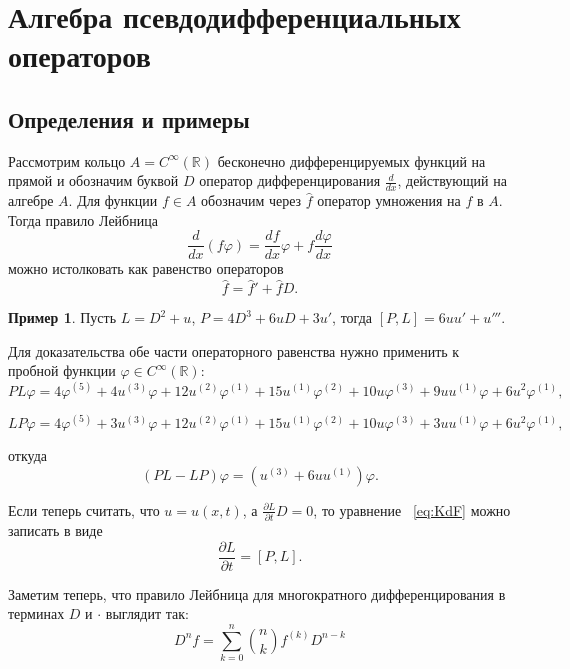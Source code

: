 \documentclass{article}
\theoremstyle{definition}
\theoremstyle{definition} %
\theoremstyle{remark}     %
\theoremstyle{definition}
\theoremstyle{definition}
\theoremstyle{definition}
\theoremstyle{definition}
\theoremstyle{definition}
\theoremstyle{definition}
\newtheorem*{example}{Пример}
\theoremstyle{definition}
\theoremstyle{definition}
\begin{document}
\newpage








\section{Алгебра псевдодифференциальных операторов}
\subsection{Определения и примеры}


Рассмотрим кольцо \(A = C^\infty(\mathbb{R})\) бесконечно дифференцируемых функций на прямой и обозначим буквой \(D\) оператор дифференцирования \(\frac{d}{dx}\), действующий на алгебре \(A\). Для функции \(f \in A\) обозначим через \(\hat{f}\) оператор умножения на \(f\) в \(A\). Тогда правило Лейбница
\[
\frac{d}{dx}(f\varphi) = \frac{df}{dx}\varphi + f\frac{d\varphi}{dx}
\]
можно истолковать как равенство операторов
\begin{equation} \label{eq:2.1}
\hat{f} = \hat{f}' + \hat{f}D.
\end{equation}


\begin{example} Пусть \(L = D^2 + u\), \(P = 4D^3 + 6uD + 3u'\), тогда \([P, L] = 6uu' + u'''\).
\end{example}
Для доказательства обе части операторного равенства нужно применить к пробной функции \(\varphi \in C^\infty(\mathbb{R})\):
\[
PL\varphi = 4\varphi^{(5)} + 4u^{(3)}\varphi + 12u^{(2)}\varphi^{(1)} + 15u^{(1)}\varphi^{(2)} + 10u\varphi^{(3)} + 9uu^{(1)}\varphi + 6u^2\varphi^{(1)},
\]

\[
LP \varphi = 4\varphi^{(5)} + 3u^{(3)}\varphi + 12u^{(2)}\varphi^{(1)} + 15u^{(1)}\varphi^{(2)} + 10u\varphi^{(3)} + 3uu^{(1)}\varphi + 6u^2\varphi^{(1)},
\]

откуда
\[
(PL - LP)\varphi = (u^{(3)} + 6uu^{(1)})\varphi.
\]

Если теперь считать, что \(u = u(x, t)\), а \(\frac{\partial L}{\partial t} D = 0\), то уравнение ~\ref{eq:KdF} можно записать в виде
\[
\frac{\partial L}{\partial t} = [P, L].
\]

Заметим теперь, что правило Лейбница для многократного дифференцирования в терминах \(D\) и \(\cdot\) выглядит так:
\begin{equation}\label{eq:2.2}
D^n f = \sum_{k=0}^n \binom{n}{k} f^{(k)} D^{n-k}
\end{equation}
\end{document}
